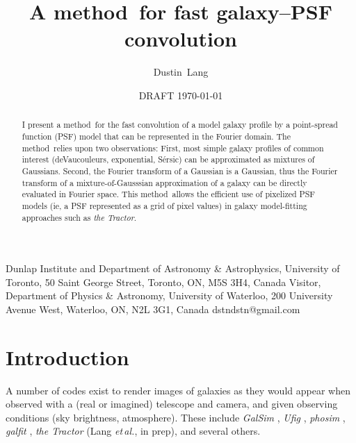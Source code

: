 \documentclass[11pt,preprint]{aastex}
\newcommand{\foreign}[1]{\emph{#1}}
\newcommand{\etal}{\foreign{et\,al.}}
\newcommand{\project}[1]{\textsl{#1}}
\newcommand{\trick}{method}
\begin{document}
\title{A \trick\ for fast galaxy--PSF convolution}
\author{Dustin~Lang}
%
{Dunlap Institute and Department of Astronomy \& Astrophysics,
  University of Toronto,
  50 Saint George Street, Toronto, ON, M5S 3H4, Canada}
%
{Visitor, Department of Physics \& Astronomy,
  University of Waterloo,
  200 University Avenue West,
  Waterloo, ON, N2L 3G1, Canada}
%
{dstndstn@gmail.com}
\date{DRAFT \today}

\begin{abstract}
  I present a \trick\ for the fast convolution of a model galaxy
  profile by a point-spread function (PSF) model that can be
  represented in the Fourier domain.  The \trick\ relies upon two
  observations: First, most simple galaxy profiles of common interest
  (deVaucouleurs, exponential, S\'ersic) can be approximated as
  mixtures of Gaussians.  Second, the Fourier transform of a Gaussian
  is a Gaussian, thus the Fourier transform of a mixture-of-Gausssian
  approximation of a galaxy can be directly evaluated in Fourier
  space.
  This \trick\ allows
  the efficient use of pixelized PSF models (ie, a PSF represented as
  a grid of pixel values) in galaxy model-fitting approaches such as
  \project{the Tractor}.
\end{abstract}

\section{Introduction}

A number of codes exist to render images of galaxies as they would
appear when observed with a (real or imagined) telescope and camera,
and given observing conditions (sky brightness, atmosphere).  These
include \project{GalSim} \citep{galsim}, \project{Ufig} \citep{ufig},
\project{phosim} \citep{phosim}, \project{galfit} \citep{galfit}, 
\project{the Tractor} (Lang \etal, in prep), and several others.

\end{document}
